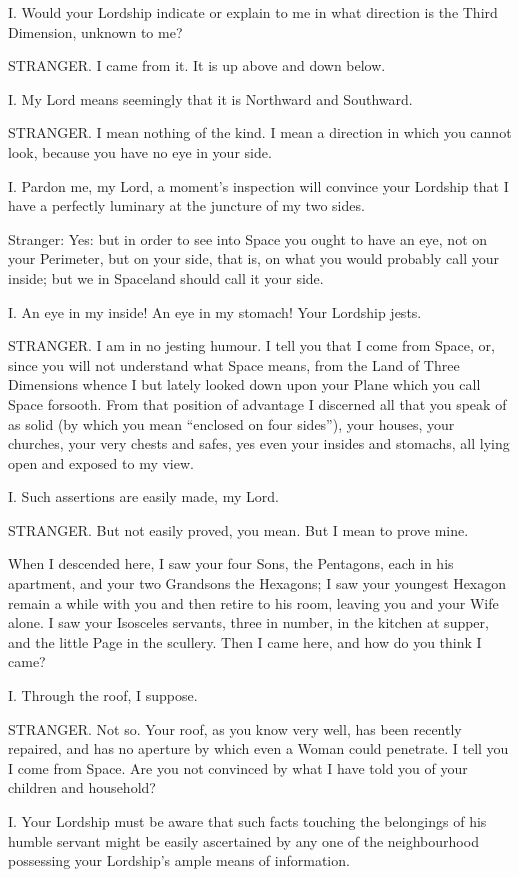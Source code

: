 \documentclass[12pt, a4paper, twoside]{memoir}
\begin{document}
I. Would your Lordship indicate or explain to me in what direction is the
Third Dimension, unknown to me?

STRANGER. I came from it. It is up above and down below.

I. My Lord means seemingly that it is Northward and Southward.

STRANGER. I mean nothing of the kind. I mean a direction in which you cannot
look, because you have no eye in your side.

I. Pardon me, my Lord, a moment's inspection will convince your Lordship that
I have a perfectly luminary at the juncture of my two sides.

Stranger: Yes: but in order to see into Space you ought to have an eye, not on
your Perimeter, but on your side, that is, on what you would probably call
your inside; but we in Spaceland should call it your side.

I. An eye in my inside! An eye in my stomach! Your Lordship jests.

STRANGER. I am in no jesting humour. I tell you that I come from Space, or,
since you will not understand what Space means, from the Land of Three
Dimensions whence I but lately looked down upon your Plane which you call
Space forsooth. From that position of advantage I discerned all that you speak
of as solid (by which you mean ``enclosed on four sides''), your houses, your
churches, your very chests and safes, yes even your insides and stomachs, all
lying open and exposed to my view.

I. Such assertions are easily made, my Lord.

STRANGER. But not easily proved, you mean. But I mean to prove mine.

When I descended here, I saw your four Sons, the Pentagons, each in his
apartment, and your two Grandsons the Hexagons; I saw your youngest Hexagon
remain a while with you and then retire to his room, leaving you and your Wife
alone. I saw your Isosceles servants, three in number, in the kitchen at
supper, and the little Page in the scullery. Then I came here, and how do you
think I came?

I. Through the roof, I suppose.

STRANGER. Not so. Your roof, as you know very well, has been recently
repaired, and has no aperture by which even a Woman could penetrate. I tell
you I come from Space. Are you not convinced by what I have told you of your
children and household?

I. Your Lordship must be aware that such facts touching the belongings of his
humble servant might be easily ascertained by any one of the neighbourhood
possessing your Lordship's ample means of information.
\end{document}
